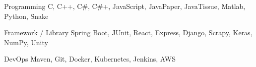 \documentclass[12pt, a4paper]{yp-vita}
\begin{document}
    \vfill

    \skillentry
        {Programming}
        {C, C++, C\#, C\#+, JavaScript, JavaPaper, JavaTissue, Matlab, Python, Snake}

    \skillentry
        {Framework / Library}
        {Spring Boot, JUnit, React, Express, Django, Scrapy, Keras, NumPy, Unity}
    
    \skillentry
        {DevOps}
        {Maven, Git, Docker, Kubernetes, Jenkins, AWS}
    
\end{document}
